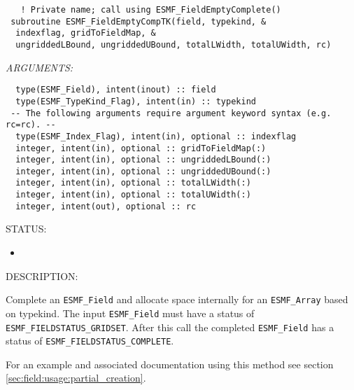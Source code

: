 \begin{verbatim}   ! Private name; call using ESMF_FieldEmptyComplete()
 subroutine ESMF_FieldEmptyCompTK(field, typekind, &
  indexflag, gridToFieldMap, &
  ungriddedLBound, ungriddedUBound, totalLWidth, totalUWidth, rc)\end{verbatim}{\em ARGUMENTS:}
\begin{verbatim}  type(ESMF_Field), intent(inout) :: field
  type(ESMF_TypeKind_Flag), intent(in) :: typekind
 -- The following arguments require argument keyword syntax (e.g. rc=rc). --
  type(ESMF_Index_Flag), intent(in), optional :: indexflag
  integer, intent(in), optional :: gridToFieldMap(:)
  integer, intent(in), optional :: ungriddedLBound(:)
  integer, intent(in), optional :: ungriddedUBound(:)
  integer, intent(in), optional :: totalLWidth(:)
  integer, intent(in), optional :: totalUWidth(:)
  integer, intent(out), optional :: rc\end{verbatim}
{\sf STATUS:}
   \begin{itemize}
   \item{}
   \end{itemize}
  
{\sf DESCRIPTION:\\ }


   \begin{sloppypar}
   Complete an {\tt ESMF\_Field} and allocate space internally for an
   {\tt ESMF\_Array} based on typekind.
   The input {\tt ESMF\_Field} must have a status of
   {\tt ESMF\_FIELDSTATUS\_GRIDSET}. After this call the completed {\tt ESMF\_Field}
   has a status of {\tt ESMF\_FIELDSTATUS\_COMPLETE}.
   \end{sloppypar}
  
   For an example and
   associated documentation using this method see section
   \ref{sec:field:usage:partial_creation}.
  
